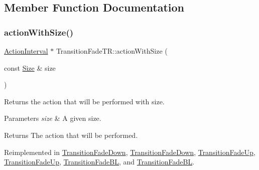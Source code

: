 \subsection{Member Function Documentation}
\mbox{\label{classTransitionFadeTR_a371a39553335050a845c6743d20aac00}} 
\subsubsection{\texorpdfstring{action\+With\+Size()}{actionWithSize()}\hspace{0.1cm}{\footnotesize\ttfamily [1/2]}}
{\footnotesize\ttfamily \hyperlink{classActionInterval}{Action\+Interval} $\ast$ Transition\+Fade\+T\+R\+::action\+With\+Size (\begin{DoxyParamCaption}\item[{const \hyperlink{classSize}{Size} \&}]{size }\end{DoxyParamCaption})\hspace{0.3cm}{\ttfamily [virtual]}}

Returns the action that will be performed with size.


\begin{DoxyParams}{Parameters}
{\em size} & A given size. \\
\hline
\end{DoxyParams}
\begin{DoxyReturn}{Returns}
The action that will be performed. 
\end{DoxyReturn}


Reimplemented in \hyperlink{classTransitionFadeDown_a7cc0da579b09b7595ea875acdccb94e3}{Transition\+Fade\+Down}, \hyperlink{classTransitionFadeDown_aa0c84d6a674134fc9a24d9e796f7cc0b}{Transition\+Fade\+Down}, \hyperlink{classTransitionFadeUp_a3657902d0401d39788d7c15a2b8485e1}{Transition\+Fade\+Up}, \hyperlink{classTransitionFadeUp_a431d43ddd9acbf1854404a036063080e}{Transition\+Fade\+Up}, \hyperlink{classTransitionFadeBL_a2669695f07ed13e35046a1507e91abe6}{Transition\+Fade\+BL}, and \hyperlink{classTransitionFadeBL_a6701b53ec643eb3fc9e078c0feaf71b0}{Transition\+Fade\+BL}.

\mbox{\label{classTransitionFadeTR_a371728d4ffa70783ea61f4f9a06afb23}} 
